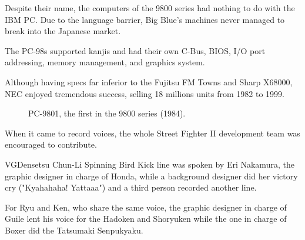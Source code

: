 Despite their name, the computers of the 9800 series had nothing to do with the IBM PC. Due to the language barrier, Big Blue's machines never managed to break into the Japanese market.

The PC-98s supported kanjis and had their own C-Bus, BIOS, I/O port addressing, memory management, and graphics system. 

Although having specs far inferior to the Fujitsu FM Towns and Sharp X68000, NEC enjoyed tremendous success, selling 18 millions units from 1982 to 1999.

\begin{figure}[H]
\caption*{PC-9801, the first in the 9800 series (1984).}
\end{figure}





When it came to record voices, the whole Street Fighter II development team was encouraged to contribute.

\begin{q}{VGDensetsu\cite{sf2samples}  }
Chun-Li Spinning Bird Kick line was spoken by Eri Nakamura, the graphic designer in charge of Honda, while a background designer did her victory cry ("Kyahahaha! Yattaaa") and a third person recorded another line.

For Ryu and Ken, who share the same voice, the graphic designer in charge of Guile lent his voice for the Hadoken and Shoryuken while the one in charge of Boxer did the Tatsumaki Senpukyaku.  
\end{q}




